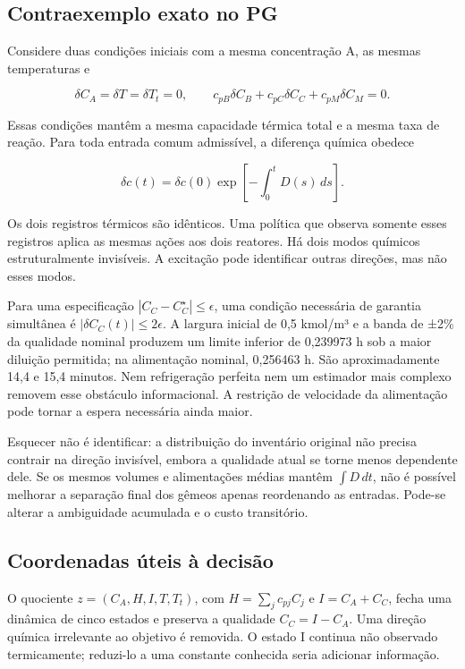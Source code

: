 \documentclass[
  11pt,
  letterpaper,
]{article}
\begin{document}
\hypertarget{contraexemplo-exato-no-pg}{%
\subsection{Contraexemplo exato no PG}\label{contraexemplo-exato-no-pg}}

Considere duas condições iniciais com a mesma concentração A, as mesmas
temperaturas e

\[
\delta C_A=\delta T=\delta T_t=0,\qquad
c_{pB}\delta C_B+c_{pC}\delta C_C+c_{pM}\delta C_M=0 .
\]

Essas condições mantêm a mesma capacidade térmica total e a mesma taxa
de reação. Para toda entrada comum admissível, a diferença química
obedece

\[
\delta c(t)=\delta c(0)\exp\!\left[-\int_0^t D(s)\,ds\right].
\]

Os dois registros térmicos são idênticos. Uma política que observa
somente esses registros aplica as mesmas ações aos dois reatores. Há
dois modos químicos estruturalmente invisíveis. A excitação pode
identificar outras direções, mas não esses modos.

Para uma especificação \(|C_C-C_C^\star|\leq\epsilon\), uma condição
necessária de garantia simultânea é \(|\delta C_C(t)|\leq2\epsilon\). A
largura inicial de 0,5 kmol/m³ e a banda de ±2\% da qualidade nominal
produzem um limite inferior de 0,239973 h sob a maior diluição
permitida; na alimentação nominal, 0,256463 h. São aproximadamente 14,4
e 15,4 minutos. Nem refrigeração perfeita nem um estimador mais complexo
removem esse obstáculo informacional. A restrição de velocidade da
alimentação pode tornar a espera necessária ainda maior.

Esquecer não é identificar: a distribuição do inventário original não
precisa contrair na direção invisível, embora a qualidade atual se torne
menos dependente dele. Se os mesmos volumes e alimentações médias mantêm
\(\int D\,dt\), não é possível melhorar a separação final dos gêmeos
apenas reordenando as entradas. Pode-se alterar a ambiguidade acumulada
e o custo transitório.

\hypertarget{coordenadas-uxfateis-uxe0-decisuxe3o}{%
\subsection{Coordenadas úteis à
decisão}\label{coordenadas-uxfateis-uxe0-decisuxe3o}}

O quociente \(z=(C_A,H,I,T,T_t)\), com \(H=\sum_j c_{pj}C_j\) e
\(I=C_A+C_C\), fecha uma dinâmica de cinco estados e preserva a
qualidade \(C_C=I-C_A\). Uma direção química irrelevante ao objetivo é
removida. O estado I continua não observado termicamente; reduzi-lo a
uma constante conhecida seria adicionar informação.
\end{document}
